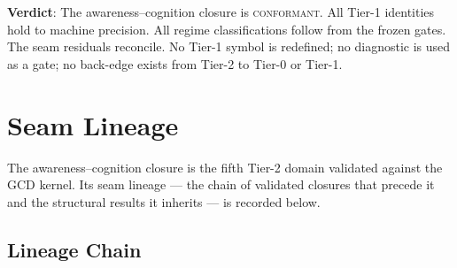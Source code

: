 \documentclass[
  aps,
  prd,
  twocolumn,
  superscriptaddress,
  nofootinbib,
  floatfix
]{revtex4-2}
\begin{document}
\textbf{Verdict}: The awareness--cognition closure is
\textsc{conformant}.  All Tier-1 identities hold to
machine precision.  All regime classifications follow from
the frozen gates.  The seam residuals reconcile.  No
Tier-1 symbol is redefined; no diagnostic is used as a
gate; no back-edge exists from Tier-2 to Tier-0 or
Tier-1.

\section{Seam Lineage}\label{app:lineage}

The awareness--cognition closure is the fifth Tier-2 domain
validated against the GCD kernel.  Its seam lineage --- the
chain of validated closures that precede it and the
structural results it inherits --- is recorded below.

\subsection{Lineage Chain}
\end{document}
